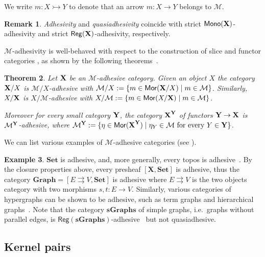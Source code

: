 \documentclass[runningheads,envcountsect]{llncs}
\newcommand{\cat}[1]{\ensuremath{\mathbf{#1}}}
\theoremstyle{plain}
\newtheorem{theorem}{Theorem}[section]
\theoremstyle{definition}
\newtheorem{example}[theorem]{Example}
\newtheorem{remark}[theorem]{Remark}
\def\X{\textbf {\textup{X}}}
\def\Y{\textbf {\textup{Y}}}
\newcommand{\mor}{\mathsf{Mor}}
\newcommand{\mon}{\mathsf{Mono}}
\newcommand{\reg}{\mathsf{Reg}}
\begin{document}
We write $m\colon X\rightarrowtail Y$ to denote that an arrow $m\colon X\to Y$ belongs to $\mathcal{M}$.

\begin{remark}
	\label{rem:salva}
	\emph{Adhesivity} and \emph{quasiadhesivity} 
	\cite{lack2005adhesive,garner2012axioms} coincide with strict
	$\mon(\X) $-adhesivity and strict $\reg(\X)$-adhesivity,
	respectively.
\end{remark}


$\mathcal{M}$-adhesivity is well-behaved with respect to  the construction of slice and functor categories \cite{mac2013categories}, as shown by the following theorems~\cite{ehrig2006fundamentals,lack2005adhesive}.

\begin{theorem}
	\label{thm:slice-functors}
	Let $\X$ be an $\mathcal{M}$-adhesive category. Given an object $X$
	the category $\X/X$ is $\mathcal{M}/X$-adhesive with
	$\mathcal{M}/X:=\{m\in \mor(\X/X) \mid m\in
	\mathcal{M}\}$. Similarly, $X/\X$ is $X/\mathcal{M}$-adhesive with
	$X/\mathcal{M}:=\{m\in \mor(X/\X) \mid m\in \mathcal{M}\}$.
	
	Moreover for every small category $\Y$, the category $\X^\Y$ of
	functors $\Y\to \X$ is $\mathcal{M}^{\Y}$-adhesive, where
	$\mathcal{M}^{\Y}:=\{\eta \in \mor(\X^\Y) \mid \eta_Y \in
	\mathcal{M} \text{ for every } Y\in \Y\}$.
\end{theorem}

We can list various examples of $\mathcal{M}$-adhesive categories (see
\cite{castelnovo2023thesis,CastelnovoGM22,lack2006toposes}).


\begin{example}
	\label{ex:adhesive}
	$\cat{Set}$ is adhesive, and, more generally, every topos is
	adhesive~\cite{lack2006toposes}. By the closure properties above, every presheaf $[\cat{X},\cat{Set}]$ is adhesive, thus the category
	$\cat{Graph} = [ E \rightrightarrows V, \cat{Set}]$ is adhesive
	where $E \rightrightarrows {V}$ is the two objects category with two
	morphisms $s,t \colon{E} \to {V}$. Similarly, various
	categories of hypergraphs can be shown to be adhesive, such as term
	graphs and hierarchical graphs~\cite{CastelnovoGM24}. Note that the category $\cat{sGraphs}$ of simple graphs, 
	i.e.~graphs without parallel edges, is
	$\reg{(\cat{sGraphs})}$-adhesive~\cite{BehrHK23} but not
	quasiadhesive.
\end{example}


\subsection{Kernel pairs}
\end{document}
